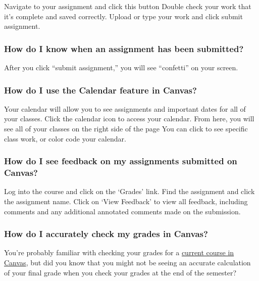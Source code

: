 Navigate to your assignment and click this button
Double check your work that it's complete and saved correctly.
Upload or type your work and click submit assignment.

\hypertarget{how-do-i-know-when-an-assignment-has-been-submitted}{%
\subsubsection{How do I know when an assignment has been submitted?}\label{how-do-i-know-when-an-assignment-has-been-submitted}}

After you click ``submit assignment,'' you will see ``confetti'' on your screen.

\hypertarget{how-do-i-use-the-calendar-feature-in-canvas}{%
\subsubsection{How do I use the Calendar feature in Canvas?}\label{how-do-i-use-the-calendar-feature-in-canvas}}

Your calendar will allow you to see assignments and important dates for all of your classes.
Click the calendar icon to access your calendar.
From here, you will see all of your classes on the right side of the page
You can click to see specific class work, or color code your calendar.

\hypertarget{how-do-i-see-feedback-on-my-assignments-submitted-on-canvas}{%
\subsubsection{How do I see feedback on my assignments submitted on Canvas?}\label{how-do-i-see-feedback-on-my-assignments-submitted-on-canvas}}

Log into the course and click on the `Grades' link.
Find the assignment and click the assignment name.
Click on `View Feedback' to view all feedback, including comments and any additional annotated comments made on the submission.

\hypertarget{how-do-i-accurately-check-my-grades-in-canvas}{%
\subsubsection{How do I accurately check my grades in Canvas?}\label{how-do-i-accurately-check-my-grades-in-canvas}}

You're probably familiar with checking your grades for a \href{https://community.canvaslms.com/t5/Student-Guide/How-do-I-view-my-grades-in-a-current-course/ta-p/493}{current course in Canvas}, but did you know that you might not be seeing an accurate calculation of your final grade when you check your grades at the end of the semester?

